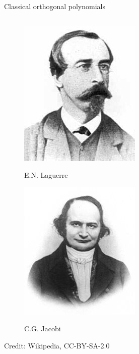 \documentclass[english,aspectratio=169]{beamer}
\begin{document}
\begin{frame}[fragile]{Classical orthogonal polynomials}
\begin{columns}[T,onlytextwidth]
\begin{column}{0.30\textwidth}
\begin{figure}[ht]
\begin{minipage}[b]{0.5\linewidth}
          \centering
          \includegraphics[height=.3\textheight]{./figures/Laguerre}\par
          {\tiny E.N. Laguerre} 
        \end{minipage}%
        \begin{minipage}[b]{0.5\linewidth}
          \centering
          \includegraphics[height=.3\textheight]{./figures/Jacobi}\par 
          {\tiny C.G. Jacobi} 
        \end{minipage} 
      \end{figure}
  
      {\hfill \raggedright \tiny Credit: Wikipedia, CC-BY-SA-2.0}
  
    \end{column}
  \end{columns}
  
  \end{frame}
\end{document}
